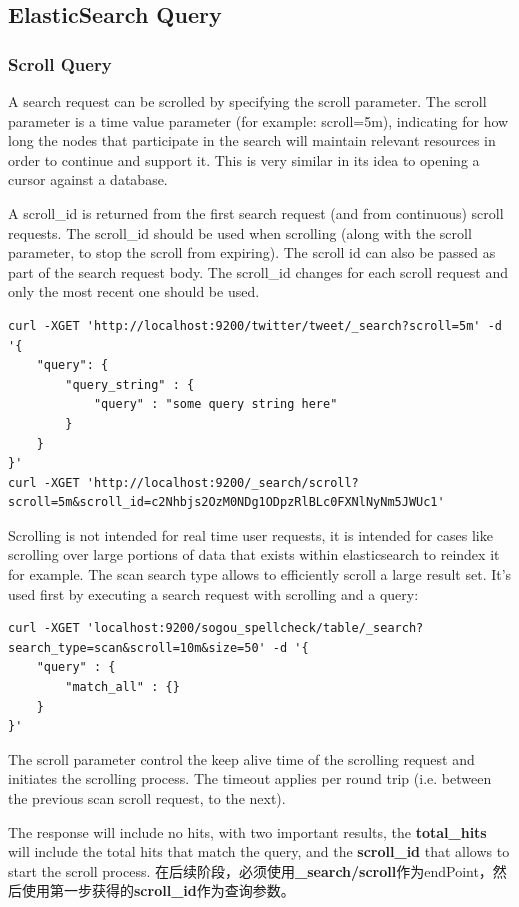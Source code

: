 \subsection{ElasticSearch Query}
\subsubsection{Scroll Query}
\par A search request can be scrolled by specifying the scroll parameter. The scroll parameter is a time value parameter (for example: scroll=5m), indicating for how long the nodes that participate in the search will maintain relevant resources in order to continue and support it. This is very similar in its idea to opening a cursor against a database.
\par A scroll\_id is returned from the first search request (and from continuous) scroll requests. The scroll\_id should be used when scrolling (along with the scroll parameter, to stop the scroll from expiring). The scroll id can also be passed as part of the search request body. The scroll\_id changes for each scroll request and only the most recent one should be used.
\begin{verbatim}
curl -XGET 'http://localhost:9200/twitter/tweet/_search?scroll=5m' -d '{
    "query": {
        "query_string" : {
            "query" : "some query string here"
        }
    }
}'
curl -XGET 'http://localhost:9200/_search/scroll?scroll=5m&scroll_id=c2Nhbjs2OzM0NDg1ODpzRlBLc0FXNlNyNm5JWUc1'
\end{verbatim}
\par Scrolling is not intended for real time user requests, it is intended for cases like scrolling over large portions of data that exists within elasticsearch to reindex it for example. The scan search type allows to efficiently scroll a large result set. It’s used first by executing a search request with scrolling and a query:
\begin{verbatim}
curl -XGET 'localhost:9200/sogou_spellcheck/table/_search?search_type=scan&scroll=10m&size=50' -d '{
    "query" : {
        "match_all" : {}
    }
}'
\end{verbatim}
\par The scroll parameter control the keep alive time of the scrolling request and initiates the scrolling process. The timeout applies per round trip (i.e. between the previous scan scroll request, to the next).
\par The response will include no hits, with two important results, the \textbf{total\_hits} will include the total hits that match the query, and the \textbf{scroll\_id} that allows to start the scroll process. 在后续阶段，必须使用\textbf{\_search/scroll}作为endPoint，然后使用第一步获得的\textbf{scroll\_id}作为查询参数。
